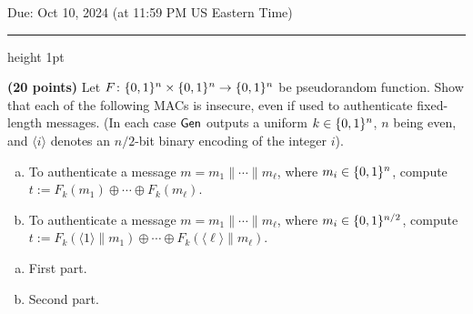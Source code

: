 \documentclass[12pt]{hw}
\begin{document}
\maketitle

\begin{center} Due: Oct 10, 2024 (at 11:59 PM US Eastern Time) \\[10pt]
  \hrule height 1pt
\end{center}

\toggletrue{answers}

\setcounter{MaxMatrixCols}{20} \setlength\parindent{0pt}







\begin{exercise}

  \textbf{(20 points)} %
  Let $F\colon \{0,1\}^n \times \{0,1\}^n \rightarrow \{0,1\}^n$ be pseudorandom function.
  Show that each of the following MACs is insecure, even if used to
  authenticate fixed-length
  messages. (In each case ${\sf Gen}$ outputs a uniform $k \in \{0,1\}^n$,
  $n$ being even, and $\langle i \rangle$ denotes an $n/2$-bit binary
  encoding of the integer $i$).
  \begin{enumerate}[(a)]
    \item To authenticate a message $m = m_1\| \cdots \| m_\ell$, where
          $m_i \in \{0,1\}^n$, compute \\
          $t := F_k(m_1)\oplus \cdots \oplus F_k(m_\ell)$.
    \item To authenticate a message $m = m_1 \| \cdots \| m_\ell$, where
          $m_i \in \{0,1\}^{n/2}$, compute \\
          $t := F_k(\langle 1 \rangle \| m_1) \oplus \cdots \oplus
            F_k(\langle \ell \rangle \| m_\ell)$.
  \end{enumerate}
\end{exercise}

\begin{answer}
  \begin{enumerate}[(a)]
    \item First part.

    \item Second part.

  \end{enumerate}
\end{answer}
\end{document}
